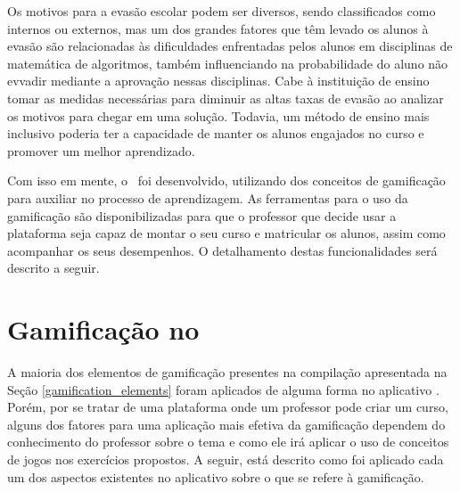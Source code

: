 Os motivos para a evasão escolar podem ser diversos, sendo classificados como internos ou externos, mas um dos grandes fatores que têm levado os alunos à evasão \cite{evasao-unb} são relacionadas às dificuldades enfrentadas pelos alunos em disciplinas de matemática de algoritmos, também influenciando na probabilidade do aluno não evvadir mediante a aprovação nessas disciplinas. Cabe à instituição de ensino tomar as medidas necessárias para diminuir as altas taxas de evasão ao analizar os motivos para chegar em uma solução. Todavia, um método de ensino mais inclusivo poderia ter a capacidade de manter os alunos engajados no curso e promover um melhor aprendizado.

Com isso em mente, o \appName\ foi desenvolvido, utilizando dos conceitos de gamificação para auxiliar no processo de aprendizagem. As ferramentas para o uso da gamificação são disponibilizadas para que o professor que decide usar a plataforma seja capaz de montar o seu curso e matricular os alunos, assim como acompanhar os seus desempenhos. O detalhamento destas funcionalidades será descrito a seguir.

\section{Gamificação no \appName}

A maioria dos elementos de gamificação presentes na compilação apresentada na Seção \ref{gamification_elements} foram aplicados de alguma forma no aplicativo \appName. Porém, por se tratar de uma plataforma onde um professor pode criar um curso, alguns dos fatores para uma aplicação mais efetiva da gamificação dependem do conhecimento do professor sobre o tema e como ele irá aplicar o uso de conceitos de jogos nos exercícios propostos. A seguir, está descrito como foi aplicado cada um dos aspectos existentes no aplicativo sobre o que se refere à gamificação.

